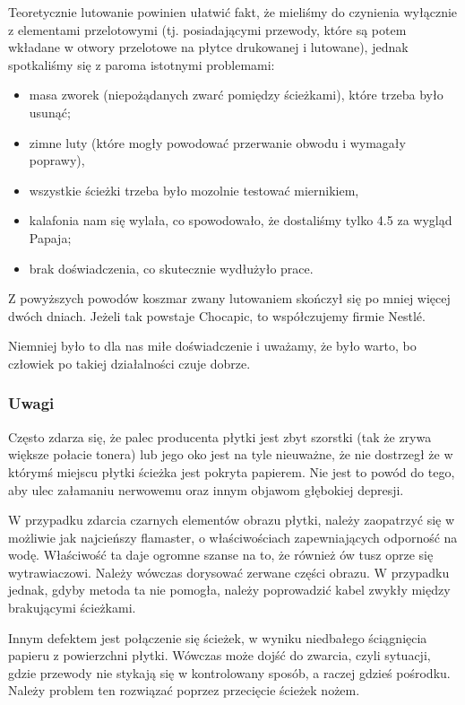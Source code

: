 Teoretycznie lutowanie powinien ułatwić fakt, że mieliśmy do czynienia wyłącznie z elementami przelotowymi (tj. posiadającymi przewody, które są potem wkładane w otwory przelotowe na płytce drukowanej i lutowane), jednak spotkaliśmy się z paroma istotnymi problemami:

\begin{itemize}
\item masa zworek (niepożądanych zwarć pomiędzy ścieżkami), które trzeba było usunąć;
\item zimne luty (które mogły powodować przerwanie obwodu i wymagały poprawy),
\item wszystkie ścieżki trzeba było mozolnie testować miernikiem,
\item kalafonia nam się wylała, co spowodowało, że dostaliśmy tylko 4.5 za wygląd Papaja;
\item brak doświadczenia, co skutecznie wydłużyło prace.
\end{itemize}

Z powyższych powodów koszmar zwany lutowaniem skończył się po mniej więcej dwóch dniach. Jeżeli tak powstaje Chocapic, to współczujemy firmie Nestlé. 

Niemniej było to dla nas miłe doświadczenie i uważamy, że było warto, bo człowiek po takiej działalności czuje dobrze.

\subsubsection{Uwagi}

Często zdarza się, że palec producenta płytki jest zbyt szorstki (tak że zrywa większe połacie tonera) lub jego oko jest na tyle nieuważne, że nie dostrzegł że w którymś miejscu płytki ścieżka jest pokryta papierem. Nie jest to powód do tego, aby ulec załamaniu nerwowemu oraz innym objawom głębokiej depresji.

W przypadku zdarcia czarnych elementów obrazu płytki, należy zaopatrzyć się w możliwie jak najcieńszy flamaster, o właściwościach zapewniających odporność na wodę. Właściwość ta daje ogromne szanse na to, że również ów tusz oprze się wytrawiaczowi. Należy wówczas dorysować zerwane części obrazu. W przypadku jednak, gdyby metoda ta nie pomogła, należy poprowadzić kabel zwykły między brakującymi ścieżkami. 

Innym defektem jest połączenie się ścieżek, w wyniku niedbałego ściągnięcia papieru z powierzchni płytki. Wówczas może dojść do zwarcia, czyli sytuacji, gdzie przewody nie stykają się w kontrolowany sposób, a raczej gdzieś pośrodku. Należy problem ten rozwiązać poprzez przecięcie ścieżek nożem. 

